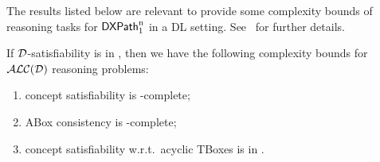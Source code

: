   The results listed below are relevant to provide some complexity bounds of reasoning tasks for $\mathsf{DXPath}_{\rm 1}^{\rm n}$ in a DL setting.  See~\cite{Lutz1998-LUTDLW-2} for further details.

  \begin{proposition} \label{prop:lutz}
    If $\mathcal{D}$-satisfiability is in \pspace, then we have the following complexity bounds for $\mathcal{ALC(D)}$ reasoning problems: 
    \begin{enumerate}
      \item concept satisfiability is \pspace-complete;
      \item ABox consistency is \pspace-complete;
      \item concept satisfiability w.r.t.\ acyclic TBoxes is in \nexptime.
    \end{enumerate}
  \end{proposition}
  